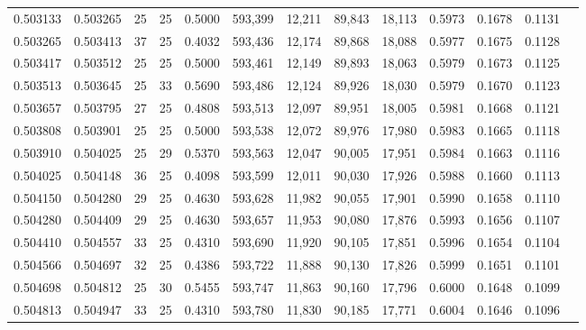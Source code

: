 \begin{tabular}{rrrrrrrrrrrrr}
0.503133 & 0.503265 &    25 &  25 &                                     0.5000 & 593,399 &  12,211 &  89,843 &  18,113 & 0.5973 & 0.1678 & 0.1131 \\
0.503265 & 0.503413 &    37 &  25 &                                     0.4032 & 593,436 &  12,174 &  89,868 &  18,088 & 0.5977 & 0.1675 & 0.1128 \\
0.503417 & 0.503512 &    25 &  25 &                                     0.5000 & 593,461 &  12,149 &  89,893 &  18,063 & 0.5979 & 0.1673 & 0.1125 \\
0.503513 & 0.503645 &    25 &  33 &                                     0.5690 & 593,486 &  12,124 &  89,926 &  18,030 & 0.5979 & 0.1670 & 0.1123 \\
0.503657 & 0.503795 &    27 &  25 &                                     0.4808 & 593,513 &  12,097 &  89,951 &  18,005 & 0.5981 & 0.1668 & 0.1121 \\
0.503808 & 0.503901 &    25 &  25 &                                     0.5000 & 593,538 &  12,072 &  89,976 &  17,980 & 0.5983 & 0.1665 & 0.1118 \\
0.503910 & 0.504025 &    25 &  29 &                                     0.5370 & 593,563 &  12,047 &  90,005 &  17,951 & 0.5984 & 0.1663 & 0.1116 \\
0.504025 & 0.504148 &    36 &  25 &                                     0.4098 & 593,599 &  12,011 &  90,030 &  17,926 & 0.5988 & 0.1660 & 0.1113 \\
0.504150 & 0.504280 &    29 &  25 &                                     0.4630 & 593,628 &  11,982 &  90,055 &  17,901 & 0.5990 & 0.1658 & 0.1110 \\
0.504280 & 0.504409 &    29 &  25 &                                     0.4630 & 593,657 &  11,953 &  90,080 &  17,876 & 0.5993 & 0.1656 & 0.1107 \\
0.504410 & 0.504557 &    33 &  25 &                                     0.4310 & 593,690 &  11,920 &  90,105 &  17,851 & 0.5996 & 0.1654 & 0.1104 \\
0.504566 & 0.504697 &    32 &  25 &                                     0.4386 & 593,722 &  11,888 &  90,130 &  17,826 & 0.5999 & 0.1651 & 0.1101 \\
0.504698 & 0.504812 &    25 &  30 &                                     0.5455 & 593,747 &  11,863 &  90,160 &  17,796 & 0.6000 & 0.1648 & 0.1099 \\
0.504813 & 0.504947 &    33 &  25 &                                     0.4310 & 593,780 &  11,830 &  90,185 &  17,771 & 0.6004 & 0.1646 & 0.1096 \\

\end{tabular}

